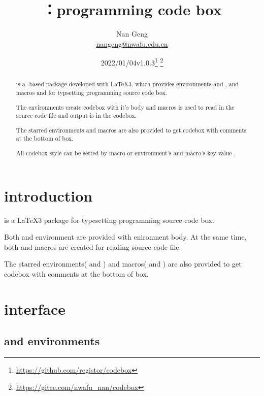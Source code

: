 \documentclass{ctxdoc-en}
\title{\bfseries\pkg{codebox}：programming code box}
\author{Nan Geng\\ \url{nangeng@nwafu.edu.cn}}
\date{2022/01/04\qquad v1.0.3\thanks{\url{https://github.com/registor/codebox}}
\thanks{\url{https://gitee.com/nwafu_nan/codebox}}}
\begin{document}
\maketitle

\begin{abstract}

 is a -based package developed with \LaTeX3,
which provides environments  and , and macros
 and  for typsetting programming source code box.

The environments create codebox with it's body and
macros is used to read in the source code file and output is in the codebox.

The starred environments and macros are also provided
to get codebox with comments at the bottom of box.

All codebox style can be setted by  macro
or environment's and macro's key-value .

\end{abstract}

\tableofcontents

\section{introduction}

 is a \LaTeX3 package for typesetting programming source code box.

Both  and  environment are provided with enironment body.
At the same time, both  and  macros are created
for reading source code file.

The starred environments( and ) and
macros( and ) are also provided
to get codebox with comments at the bottom of box.

\section{interface}

\subsection{ and  environments}
\end{document}
